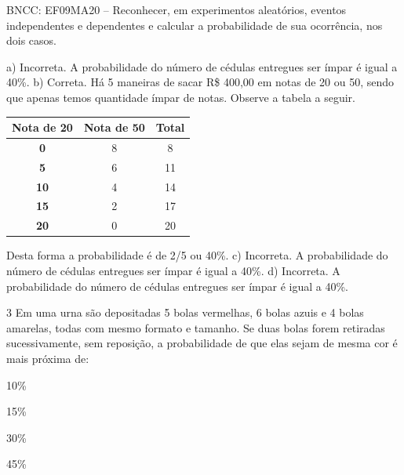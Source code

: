 {{{\begin{escolha}
{{{{\begin{escolha}
\begin{escolha}
{{\begin{enumerate}
{{BNCC: EF09MA20 -- Reconhecer, em experimentos aleatórios, eventos independentes
e dependentes e calcular a probabilidade de sua ocorrência, nos dois casos. 

a) Incorreta. A probabilidade do número de cédulas entregues ser ímpar é igual a 40\%. 
b) Correta. Há 5 maneiras de sacar R\$ 400,00 em notas de 20 ou 50, sendo que apenas temos quantidade ímpar de notas. Observe a tabela a seguir.

\begin{table}[]
\begin{tabular}{|c|c|c|}
\hline
\textbf{Nota de 20} & \textbf{Nota de 50} & \textbf{Total} \\ \hline
\textbf{0} & 8 & 8 \\ \hline
\textbf{5} & 6 & 11 \\ \hline
\textbf{10} & 4 & 14 \\ \hline
\textbf{15} & 2 & 17 \\ \hline
\textbf{20} & 0 & 20 \\ \hline
\end{tabular}
\end{table}

Desta forma a probabilidade é de 2/5 ou 40\%.
c) Incorreta. A probabilidade do número de cédulas entregues ser ímpar é igual a 40\%. 
d) Incorreta. A probabilidade do número de cédulas entregues ser ímpar é igual a 40\%.}

\num{3} Em uma urna são depositadas 5 bolas vermelhas, 6 bolas azuis e 4 bolas
amarelas, todas com mesmo formato e tamanho. Se duas bolas forem
retiradas sucessivamente, sem reposição, a probabilidade de que elas
sejam de mesma cor é mais próxima de:

\begin{escolha}

  \item 10\%

  \item 15\%

  \item 30\%

  \item 45\%

\end{escolha}

}
\end{enumerate}}}
\end{escolha}
\end{escolha}}}}}
\end{escolha}}}}
